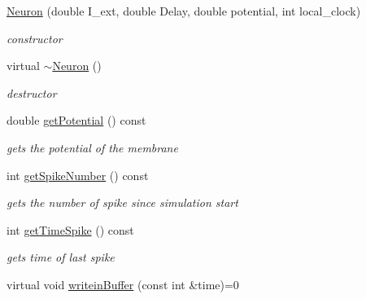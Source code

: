 \begin{DoxyCompactItemize}
\item 
\hyperlink{classNeuron_a7124c9a35644b0ae3fd47f7838c87950}{Neuron} (double I\-\_\-ext, double Delay, double potential, int local\-\_\-clock)
\begin{DoxyCompactList}\small\item\em constructor \end{DoxyCompactList}\item 
\hypertarget{classNeuron_a94a250ce7e167760e593979b899745b1}{virtual \hyperlink{classNeuron_a94a250ce7e167760e593979b899745b1}{$\sim$\-Neuron} ()}\label{classNeuron_a94a250ce7e167760e593979b899745b1}

\begin{DoxyCompactList}\small\item\em destructor \end{DoxyCompactList}\item 
\hypertarget{classNeuron_ae2bc004a58621da0d1c51591400ca87d}{double \hyperlink{classNeuron_ae2bc004a58621da0d1c51591400ca87d}{get\-Potential} () const }\label{classNeuron_ae2bc004a58621da0d1c51591400ca87d}

\begin{DoxyCompactList}\small\item\em gets the potential of the membrane \end{DoxyCompactList}\item 
\hypertarget{classNeuron_af4482bf7c03f6ac6d6a510fd9c022073}{int \hyperlink{classNeuron_af4482bf7c03f6ac6d6a510fd9c022073}{get\-Spike\-Number} () const }\label{classNeuron_af4482bf7c03f6ac6d6a510fd9c022073}

\begin{DoxyCompactList}\small\item\em gets the number of spike since simulation start \end{DoxyCompactList}\item 
\hypertarget{classNeuron_ac800b0047abe17000848648ed81e1017}{int \hyperlink{classNeuron_ac800b0047abe17000848648ed81e1017}{get\-Time\-Spike} () const }\label{classNeuron_ac800b0047abe17000848648ed81e1017}

\begin{DoxyCompactList}\small\item\em gets time of last spike \end{DoxyCompactList}\item 
\hypertarget{classNeuron_a41c979859ae91f8f80d58b2d01e1421e}{virtual void \hyperlink{classNeuron_a41c979859ae91f8f80d58b2d01e1421e}{writein\-Buffer} (const int \&time)=0}\label{classNeuron_a41c979859ae91f8f80d58b2d01e1421e}


\end{DoxyCompactItemize}
